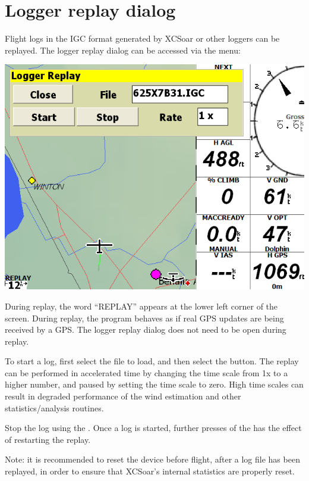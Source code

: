 \documentclass[a4paper,12pt]{refrep}
\begin{document}
\section{Logger replay dialog}

Flight logs in the IGC format generated by XCSoar or other loggers can
be replayed.  The logger replay dialog can be accessed via the
menu:
\begin{quote}
\blink{}
\end{quote}

\begin{center}
\includegraphics[angle=0,width=\linewidth,keepaspectratio='true']{figures/loggerreplay.png}
\end{center}

During replay, the word ``REPLAY'' appears at the lower left corner of
the screen.  During replay, the program behaves as if real GPS updates
are being received by a GPS.  The logger replay dialog does not need
to be open during replay.

To start a log, first select the file to load, and then select the
 button.  The replay can be performed in accelerated time
by changing the time scale from 1x to a higher number, and paused by
setting the time scale to zero.  High time scales can result in degraded
performance of the wind estimation and other statistics/analysis routines.

Stop the log using the .
Once a log is started, further presses of the  has the
effect of restarting the replay.

Note: it is recommended to reset the device before flight, after a log
file has been replayed, in order to ensure that XCSoar's internal
statistics are properly reset.
\end{document}
